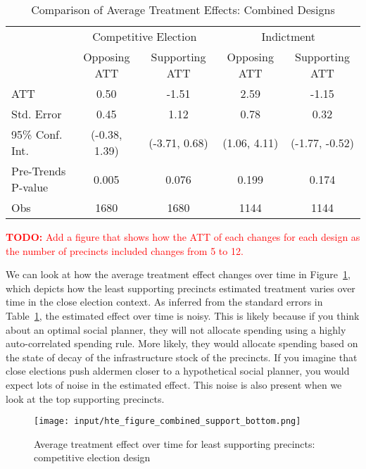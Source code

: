\begin{table}[ht]
    \centering
    \caption{Comparison of Average Treatment Effects: Combined Designs}
    \label{tab:att_comparison_combined}
    \begin{tabular}{lcc|cc}
    \hline
     & \multicolumn{2}{c|}{Competitive Election} & \multicolumn{2}{c}{Indictment} \\
     & Opposing ATT & Supporting ATT & Opposing ATT & Supporting ATT \\
    \hline
    ATT & 0.50 & -1.51 & 2.59 & -1.15 \\
    Std. Error & 0.45 & 1.12 & 0.78 & 0.32 \\
    95\% Conf. Int. & (-0.38, 1.39) & (-3.71, 0.68) & (1.06, 4.11) & (-1.77, -0.52) \\
    Pre-Trends P-value & 0.005  & 0.076 & 0.199 & 0.174 \\
    Obs & 1680 & 1680 & 1144 & 1144 \\
    \hline
    \end{tabular}
\end{table}

\textcolor{red}{\textbf{TODO:} Add a figure that shows how the ATT of each changes for each design as the number of precincts included changes from 5 to 12.}

We can look at how the average treatment effect changes over time in Figure~\ref{fig:att_comparison_close_election_bottom}, which depicts how the least supporting precincts estimated treatment varies over time in the close election context.
As inferred from the standard errors in Table~\ref{tab:att_comparison_combined}, the estimated effect over time is noisy.
This is likely because if you think about an optimal social planner, they will not allocate spending using a highly auto-correlated spending rule.
More likely, they would allocate spending based on the state of decay of the infrastructure stock of the precincts.
If you imagine that close elections push aldermen closer to a hypothetical social planner, you would expect lots of noise in the estimated effect.
This noise is also present when we look at the top supporting precincts.
\begin{figure}[ht]
    \centering
    \texttt{[image: input/hte\_figure\_combined\_support\_bottom.png]}
    \caption{Average treatment effect over time for least supporting precincts: competitive election design}
    \label{fig:att_comparison_close_election_bottom}
\end{figure}


